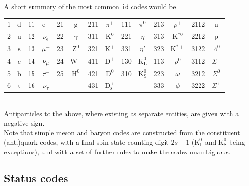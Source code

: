 \documentclass[12pt,a4paper]{article}
\newcommand{\mrm}[1]{\mathrm{#1}}
\renewcommand{\b}{{\mathrm b}}
\renewcommand{\c}{{\mathrm c}}
\renewcommand{\d}{{\mathrm d}}
\newcommand{\e}{{\mathrm e}}
\newcommand{\g}{{\mathrm g}}
\newcommand{\n}{{\mathrm n}}
\newcommand{\p}{{\mathrm p}}
\newcommand{\s}{{\mathrm s}}
\renewcommand{\t}{{\mathrm t}}
\renewcommand{\u}{{\mathrm u}}
\newcommand{\D}{{\mathrm D}}
\renewcommand{\H}{{\mathrm H}}
\newcommand{\K}{{\mathrm K}}
\newcommand{\W}{{\mathrm W}}
\newcommand{\Z}{{\mathrm Z}}
\begin{document}
A short summary of the most common \texttt{id} codes would be\\[2mm] 
\begin{tabular}{|cc|cc|cc|cc|cc|cc|cc|}
\hline
1 & $\d$ & 11 & $\e^-$      & 21  & $\g$ & 211 & $\pi^+$ 
& 111 & $\pi^0$ & 213 & $\rho^+$ & 2112 & $\n$ \\
2 & $\u$ & 12 & $\nu_{\e}$   & 22 & $\gamma$ & 311 & $\K^0$
& 221 & $\eta$ & 313 & $\K^{*0}$ & 2212 & $\p$  \\
3 & $\s$ & 13 & $\mu^-$     & 23 & $\Z^0$  & 321 & $\K^+$
& 331 & $\eta'$ & 323 & $\K^{*+}$ & 3122 & $\Lambda^0$ \\
4 & $\c$ & 14 & $\nu_{\mu}$  & 24 & $\W^+$ & 411 & $\D^+$
& 130 & $\K^0_{\mrm{L}}$ & 113 & $\rho^0$ & 3112 & $\Sigma^-$ \\
5 & $\b$ & 15 & $\tau^-$    & 25 & $\H^0$ & 421 & $\D^0$
& 310 & $\K^0_{\mrm{S}}$ & 223 & $\omega$ & 3212 & $\Sigma^0$  \\
6 & $\t$ & 16 & $\nu_{\tau}$ &  &  & 431 & $\D_{\s}^+$
& & & 333 & $\phi$ & 3222 & $\Sigma^+$ \\
\hline
\end{tabular}\\[2mm]
Antiparticles to the above, where existing as separate entities, 
are given with a negative sign.\\
Note that simple meson and baryon codes are constructed from 
the constituent (anti)quark codes, with a final spin-state-counting digit 
$2 s + 1$ ($\K^0_{\mrm{L}}$ and $\K^0_{\mrm{S}}$ being exceptions), and with
a set of further rules to make the codes unambiguous.  

\subsection{Status codes}
\end{document}
